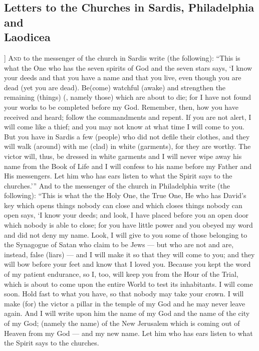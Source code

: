 \begin{pages}
\begin{Leftside}
        			\chapter{Letters to the Churches in Sardis, Philadelphia and \\ Laodicea}
				]
		\renewcommand{\LettrineFontHook}{\Zallmanfamily}
		\lettrine[lines=3]{A}{nd} to the messenger of the church in Sardis write (the following): “This is what the One who has the seven spirits of God and the seven stars says, ‘I know your deeds and that you have a name and that you live, even though you are dead (yet you are dead). Be(come) watchful (awake) and strengthen the remaining (things) (, namely those) which are about to die; for I have not found your works to be completed before my God. Remember, then, how you have received and heard; follow the commandments and repent. If you are not alert, I will come like a thief; and you may not know at what time I will come to you.
		\pend
		\pstart
		But you have in Sardis a few (people) who did not defile their clothes, and they will walk (around) with me (clad) in white (garments), for they are worthy. The victor will, thus, be dressed in white garments and I will never wipe away his name from the Book of Life and I will confess to his name before my Father and His messengers. Let him who has ears listen to what the Spirit says to the churches.’”
		\pend
		\pstart
		And to the messenger of the church in Philadelphia write (the following): “This is what the the Holy One, the True One, He who has David’s key which opens things nobody can close and which closes things nobody can open says, ‘I know your deeds; and look, I have placed before you an open door which nobody is able to close; for you have little power and you obeyed my word and did not deny my name. Look, I will give to you some of those belonging to the Synagogue of Satan who claim to be Jews — but who are not and are, instead, false (liars) — and I will make it so that they will come to you; and they will bow before your feet and know that I loved you. Because you kept the word of my patient endurance, so I, too, will keep you from the Hour of the Trial, which is about to come upon the entire World to test its inhabitants. I will come soon. Hold fast to what you have, so that nobody may take your crown. I will make (for) the victor a pillar in the temple of my God and he may never leave again. And I will write upon him the name of my God and the name of the city of my God; (namely the name) of the New Jerusalem which is coming out of Heaven from my God — and my new name. Let him who has ears listen to what the Spirit says to the churches.

\end{Leftside}
\end{pages}
